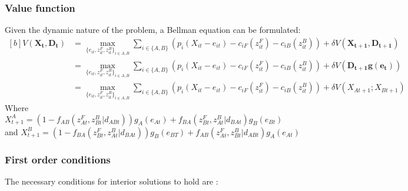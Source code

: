 \documentclass{article}
\begin{document}
\subsubsection{Value function}
Given the dynamic nature of the problem, a Bellman equation can be formulated: 
\begin{equation}
\begin{aligned}[b]
V(\mathbf{X_t,D_t}) &= \max_{ \{e_{it}, z_{it}^F, z_{it}^B\}_{i \in A,B} } \sum_{i \in \{A,B\}} \left( p_i(X_{it} - e_{it}) - c_{iF}(z_{it}^F) - c_{iB}(z_{it}^B) \right)+ \delta V\left(\mathbf{X_{t+1}, D_{t+1}}\right)\\
& = \max_{ \{e_{it}, z_{it}^F, z_{it}^B\}_{i \in A,B} } \sum_{i \in \{A,B\}} \left(p_i(X_{it} - e_{it}) - c_{iF}(z_{it}^F) - c_{iB}(z_{it}^B) \right) + \delta V(\mathbf{D_{t+1}g(e_t)})\\
&= \max_{ \{e_{it}, z_{it}^F, z_{it}^B\}_{i \in A,B} } \sum_{i \in \{A,B\}} \left( p_i(X_{it} - e_{it}) - c_{iF}(z_{it}^F) - c_{iB}(z_{it}^B)\right) + \delta V\left(X_{At+1}; X_{Bt+1} \right)
\end{aligned}
\end{equation}
Where $X_{t+1}^A = (1-f_{AB}(z^F_{At}, z^B_{Bt}| d_{ABt}))g_A(e_{At})+f_{BA}(z^F_{Bt}, z^B_{At}| d_{BAt})g_B(e_{Bt})$\\

and $X_{t+1}^B =(1 - f_{BA}(z^F_{Bt}, z^B_{At}| d_{BAt}))g_B(e_{BT}) +f_{AB}(z^F_{At}, z^B_{Bt}| d_{ABt})g_A(e_{At})$

\subsubsection{First order conditions}
The necessary conditions for interior solutions to hold are :
\end{document}
